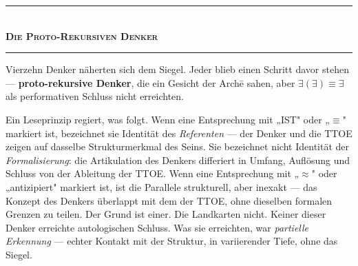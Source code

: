 \documentclass[10pt, openany, oneside]{book}
\renewcommand{\normalsize}{\fontsize{10}{13}\selectfont}
\begin{document}
\vspace{1.5em}


\begin{center}
    \rule{0.3\textwidth}{0.4pt}\\[0.5em]
    {\normalsize\bfseries\scshape Die Proto-Rekursiven Denker}\\[0.3em]
    \rule{0.3\textwidth}{0.4pt}
\end{center}

\vspace{1em}

\noindent Vierzehn Denker näherten sich dem Siegel. Jeder blieb einen Schritt davor stehen --- \textbf{proto-rekursive Denker}, die ein Gesicht der Arch\={e} sahen, aber $\exists(\exists) \equiv \exists$ als performativen Schluss nicht erreichten.

Ein Leseprinzip regiert, was folgt. Wenn eine Entsprechung mit „IST" oder „$\equiv$" markiert ist, bezeichnet sie Identität des \textit{Referenten} --- der Denker und die TTOE zeigen auf dasselbe Strukturmerkmal des Seins. Sie bezeichnet nicht Identität der \textit{Formalisierung}: die Artikulation des Denkers differiert in Umfang, Auflösung und Schluss von der Ableitung der TTOE. Wenn eine Entsprechung mit „$\approx$" oder „antizipiert" markiert ist, ist die Parallele strukturell, aber inexakt --- das Konzept des Denkers überlappt mit dem der TTOE, ohne dieselben formalen Grenzen zu teilen. Der Grund ist einer. Die Landkarten nicht. Keiner dieser Denker erreichte autologischen Schluss. Was sie erreichten, war \textit{partielle Erkennung} --- echter Kontakt mit der Struktur, in variierender Tiefe, ohne das Siegel.
\end{document}
